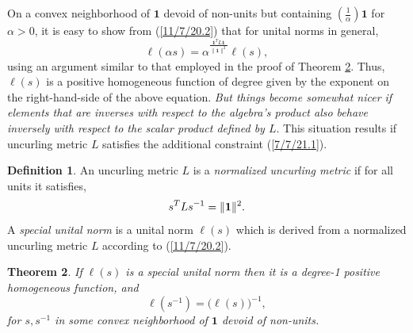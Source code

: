 \documentclass{amsart}
\numberwithin{equation}{section}
\newtheorem{theorem}{Theorem}
\theoremstyle{definition}
\newtheorem{definition}[theorem]{Definition}
\numberwithin{theorem}{section}
\begin{document}
On a convex neighborhood of $\mathbf{1}$ devoid of non-units but containing $\left(\frac{1}{\alpha}\right)\mathbf{1}$ for $\alpha>0$, it is easy to show from (\ref{11/7/20.2}) that for unital norms in general, \[  \ell(\alpha s) = \alpha^{\frac{\mathbf{1}^T L \mathbf{1}}{\|\mathbf{1}\|^2}} \ell(s),\] using an argument similar to that employed in the proof of Theorem \ref{9/24/23.1}. Thus, $ \ell(s)$ is a positive homogeneous function of degree given by the exponent on the right-hand-side of the above equation.  
   {\it But things become somewhat nicer if elements that are inverses with respect to the algebra's product also behave inversely with respect to the scalar product defined by $L$}.  
    This situation results if uncurling metric $L$ satisfies the additional constraint (\ref{7/7/21.1}).
 
\begin{definition}\label{9/20/23.1} An uncurling metric $L$ is a {\it normalized uncurling metric} if for all units it satisfies, \begin{equation} \label{7/7/21.1} s^TLs^{-1} =\|{\bf 1}\|^2.\end{equation}  A {\it special unital norm} is a unital norm $ \ell(s)$ which is derived from a normalized uncurling metric $L$ according to (\ref{11/7/20.2}). 
\end{definition}

\begin{theorem}\label{9/24/23.1} If $ \ell(s)$ is a special unital norm then it is a degree-1 positive homogeneous function, and
\begin{equation}\label{5/23/23.3}  \ell(s^{-1}) = \big( \ell(s)\big)^{-1}, \end{equation} for $s,s^{-1}$ in some convex neighborhood of $\mathbf{1}$ devoid of non-units. \end{theorem}
\end{document}
